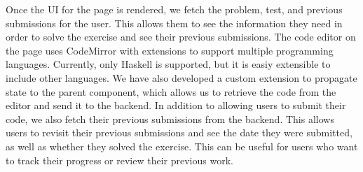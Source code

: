 Once the UI for the page is rendered, we fetch the problem, test, and previous submissions for the user.
This allows them to see the information they need in order to solve the exercise and see their previous submissions.
The code editor on the page uses CodeMirror with extensions to support multiple programming languages.
Currently, only Haskell is supported, but it is easiy extensible to include other languages.
We have also developed a custom extension to propagate state to the parent component, which allows us to retrieve the code from the editor and send it to the backend.
In addition to allowing users to submit their code, we also fetch their previous submissions from the backend.
This allows users to revisit their previous submissions and see the date they were submitted, as well as whether they solved the exercise.
This can be useful for users who want to track their progress or review their previous work.


